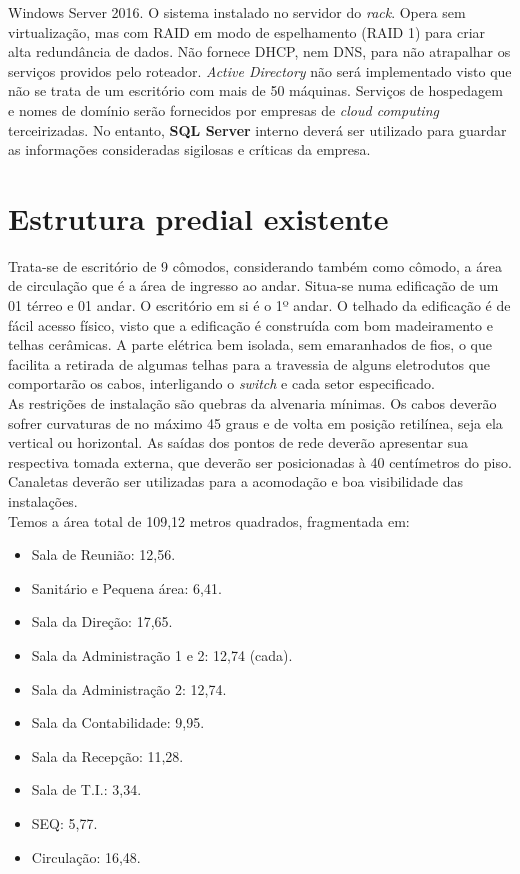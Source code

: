 \documentclass[	DIV=calc,%
							paper=a4,%
							fontsize=12pt,%
							onecolumn]{scrartcl}	 					%
\begin{document}
Windows Server 2016. O sistema instalado no servidor do \textit{rack}. Opera sem virtualização, mas com RAID em modo de espelhamento (RAID 1) para criar alta redundância de dados. Não fornece DHCP, nem DNS, para não atrapalhar os serviços providos pelo roteador. \textit{Active Directory }não será implementado visto que não se trata de um escritório com mais de 50 máquinas. Serviços de hospedagem e nomes de domínio serão fornecidos por empresas de \textit{cloud computing} terceirizadas. No entanto, \textbf{SQL Server} interno deverá ser utilizado para guardar as informações consideradas sigilosas e críticas da empresa.


\section{Estrutura predial existente}

Trata-se de escritório de 9 cômodos, considerando também como cômodo, a área de circulação que é a área de ingresso ao andar. Situa-se numa edificação de um 01 térreo e 01 andar. O escritório em si é o 1º andar. O telhado da edificação é de fácil acesso físico, visto que a edificação é construída com bom madeiramento e telhas cerâmicas. A parte elétrica bem isolada, sem emaranhados de fios, o que facilita a retirada de algumas telhas para a travessia de alguns eletrodutos que comportarão os cabos, interligando o \textit{switch} e cada setor especificado. \\

As restrições de instalação são quebras da alvenaria mínimas. Os cabos deverão sofrer curvaturas de no máximo 45 graus e de volta em posição retilínea, seja ela vertical ou horizontal. As saídas dos pontos de rede deverão apresentar sua respectiva tomada externa, que deverão ser posicionadas à 40 centímetros do piso. Canaletas deverão ser utilizadas para a acomodação e boa visibilidade das instalações.
\\

Temos a área total de 109,12 metros quadrados, fragmentada em:

\begin{itemize}
	\item Sala de Reunião: 12,56.
	\item Sanitário e Pequena área: 6,41.
	\item Sala da Direção: 17,65.
	\item Sala da Administração 1 e 2: 12,74 (cada).
	\item Sala da Administração 2: 12,74.
	\item Sala da Contabilidade: 9,95.
	\item Sala da Recepção: 11,28.
	\item Sala de T.I.: 3,34.
	\item SEQ: 5,77.
	\item Circulação: 16,48.
	
	
\end{itemize}
\end{document}
